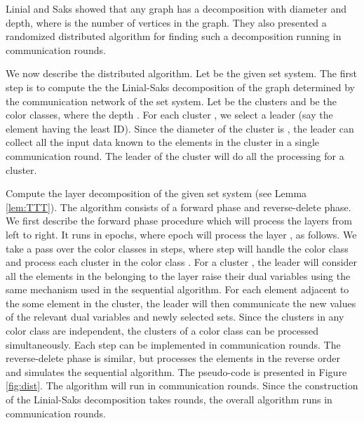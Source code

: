 \documentclass[11pt]{article}
\begin{document}
Linial and Saks \cite{LS} showed that any graph has
a decomposition with  diameter and  depth, where  is the number of vertices in the graph.
They also presented a randomized distributed algorithm for finding such a decomposition
running in  communication rounds.

We now describe the distributed algorithm. 
Let  be the given set system.
The first step is to compute the the Linial-Saks decomposition of the graph determined by the communication network
of the set system.
Let  be the clusters and 
 be the color classes, where the depth .
For each cluster , we select a leader (say the element having the least ID).
Since the diameter of the cluster is , the leader can collect all the input data
known to the elements in the cluster in a single communication round.
The leader of the cluster will do all the processing for a cluster.

Compute the layer decomposition of the given set system  (see Lemma \ref{lem:TTT}).
The algorithm consists of a forward phase and reverse-delete phase.
We first describe the forward phase procedure which will process the layers from left to right.
It runs in  epochs, where epoch  will process the layer , as follows.
We take a pass over the color classes  in  steps,
where step  will handle the color class  and process each cluster in the color class .
For a cluster , the leader will consider all the elements in the
belonging to the layer  raise their dual variables using the same mechanism used in the
sequential algorithm. For each element adjacent to the some element in the cluster, 
the leader will then communicate the new values of the relevant dual variables and newly selected sets.
Since the clusters in any color class are independent,
the clusters of a color class can be processed simultaneously.
Each step can be implemented in  communication rounds.
The reverse-delete phase is similar, but processes the elements in the reverse order
and simulates the sequential algorithm.
The pseudo-code is presented in Figure \ref{fig:dist}.
The algorithm will run in  communication rounds.
Since the construction of the Linial-Saks decomposition takes  rounds,
the overall algorithm runs in  communication rounds.
\end{document}
